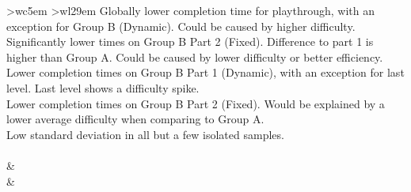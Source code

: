 \begin{table}[hbt!]
\begin{center}
\begin{tabular}{ >{\footnotesize}w{c}{5em} >{\footnotesize}w{l}{29em} }
{            %
            \textbullet\space Globally lower completion time for  playthrough, with an exception for Group B (Dynamic). Could be caused by higher difficulty. \\
            \textbullet\space Significantly lower times on Group B Part 2 (Fixed). Difference to part 1 is higher than Group A. Could be caused by lower difficulty or better efficiency. \\
            \textbullet\space Lower completion times on Group B Part 1 (Dynamic), with an exception for last level. Last level shows a difficulty spike. \\
            \textbullet\space Lower completion times on Group B Part 2 (Fixed). Would be explained by a lower average difficulty when comparing to Group A.\\
            \textbullet\space Low standard deviation in all but a few isolated samples. \\
        } \\
         & 
         \\
         & 
\end{tabular}
\end{center}
\end{table}
